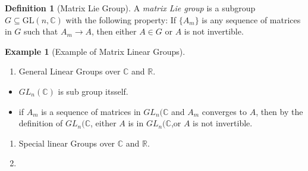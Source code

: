 \documentclass[
]{book}
\providecommand{\tightlist}{%
  \setlength{\itemsep}{0pt}\setlength{\parskip}{0pt}}
\theoremstyle{definition}
\newtheorem{definition}{Definition}[chapter]
\theoremstyle{definition}
\newtheorem{example}{Example}[chapter]
\theoremstyle{definition}
\theoremstyle{definition}
\theoremstyle{remark}
\begin{document}
\begin{definition}[Matrix Lie Group]
\protect\hypertarget{def:unnamed-chunk-4}{}\label{def:unnamed-chunk-4}A \emph{matrix Lie group} is a subgroup \(G \subseteq \mathrm{GL}(n, \mathbb{C})\) with the following property: If \(\{A_m\}\) is any sequence of matrices in \(G\) such that \(A_m \to A\), then either \(A \in G\) or \(A\) is not invertible.
\end{definition}

\begin{example}[Example of Matrix Linear Groups]
\protect\hypertarget{exm:unnamed-chunk-5}{}\label{exm:unnamed-chunk-5}\leavevmode

\begin{enumerate}
\def\labelenumi{\arabic{enumi}.}
\tightlist
\item
  General Linear Groups over \(\mathbb{C}\) and \(\mathbb{R}\).
\end{enumerate}

\begin{itemize}
\tightlist
\item
  \(GL_n(\mathbb{C})\) is sub group itsself.
\item
  if \(A_m\) is a sequence of matrices in \(GL_n(\mathbb{C}\) and \(A_m\) converges to \(A\), then by the definition of \(GL_n(\mathbb{C}\), either \(A\) is in \(GL_n(\mathbb{C}\),or \(A\) is not invertible.
\end{itemize}

\begin{enumerate}
\def\labelenumi{\arabic{enumi}.}
\tightlist
\item
  Special linear Groups over \(\mathbb{C}\) and \(\mathbb{R}\).
\item
\end{enumerate}

\end{example}
\end{document}
